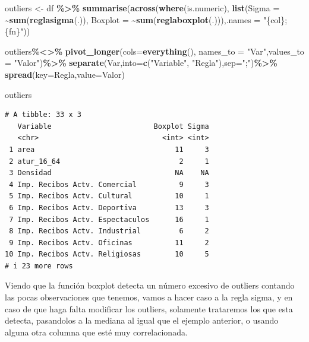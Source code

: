 \documentclass[notspecified,article,submit,moreauthors,pdftex]{Definitions/mdpi}
\newenvironment{Shaded}{\begin{snugshade}}{\end{snugshade}}
\newcommand{\AttributeTok}[1]{\textcolor[rgb]{0.13,0.29,0.53}{#1}}
\newcommand{\FunctionTok}[1]{\textcolor[rgb]{0.13,0.29,0.53}{\textbf{#1}}}
\newcommand{\NormalTok}[1]{#1}
\newcommand{\OtherTok}[1]{\textcolor[rgb]{0.56,0.35,0.01}{#1}}
\newcommand{\SpecialCharTok}[1]{\textcolor[rgb]{0.81,0.36,0.00}{\textbf{#1}}}
\newcommand{\StringTok}[1]{\textcolor[rgb]{0.31,0.60,0.02}{#1}}
\begin{document}
\begin{Shaded}
\begin{Highlighting}[]
\NormalTok{outliers }\OtherTok{\textless{}{-}}\NormalTok{ df }\SpecialCharTok{\%\textgreater{}\%}
  \FunctionTok{summarise}\NormalTok{(}\FunctionTok{across}\NormalTok{(}\FunctionTok{where}\NormalTok{(is.numeric), }\FunctionTok{list}\NormalTok{(}\AttributeTok{Sigma =} \SpecialCharTok{\textasciitilde{}}\FunctionTok{sum}\NormalTok{(}\FunctionTok{reglasigma}\NormalTok{(.)), }\AttributeTok{Boxplot =} \SpecialCharTok{\textasciitilde{}}\FunctionTok{sum}\NormalTok{(}\FunctionTok{reglaboxplot}\NormalTok{(.))),}\AttributeTok{.names =} \StringTok{"\{col\};\{fn\}"}\NormalTok{))}

\NormalTok{outliers}\SpecialCharTok{\%\textless{}\textgreater{}\%}
  \FunctionTok{pivot\_longer}\NormalTok{(}\AttributeTok{cols=}\FunctionTok{everything}\NormalTok{(), }\AttributeTok{names\_to =} \StringTok{"Var"}\NormalTok{,}\AttributeTok{values\_to =} \StringTok{"Valor"}\NormalTok{)}\SpecialCharTok{\%\textgreater{}\%}
  \FunctionTok{separate}\NormalTok{(Var,}\AttributeTok{into=}\FunctionTok{c}\NormalTok{(}\StringTok{"Variable"}\NormalTok{, }\StringTok{"Regla"}\NormalTok{),}\AttributeTok{sep=}\StringTok{";"}\NormalTok{)}\SpecialCharTok{\%\textgreater{}\%}
  \FunctionTok{spread}\NormalTok{(}\AttributeTok{key=}\NormalTok{Regla,}\AttributeTok{value=}\NormalTok{Valor)}

\NormalTok{outliers}
\end{Highlighting}
\end{Shaded}

\begin{verbatim}
# A tibble: 33 x 3
   Variable                        Boxplot Sigma
   <chr>                             <int> <int>
 1 area                                 11     3
 2 atur_16_64                            2     1
 3 Densidad                             NA    NA
 4 Imp. Recibos Actv. Comercial          9     3
 5 Imp. Recibos Actv. Cultural          10     1
 6 Imp. Recibos Actv. Deportiva         13     3
 7 Imp. Recibos Actv. Espectaculos      16     1
 8 Imp. Recibos Actv. Industrial         6     2
 9 Imp. Recibos Actv. Oficinas          11     2
10 Imp. Recibos Actv. Religiosas        10     5
# i 23 more rows
\end{verbatim}

Viendo que la función boxplot detecta un número excesivo de outliers
contando las pocas observaciones que tenemos, vamos a hacer caso a la
regla sigma, y en caso de que haga falta modificar los outliers,
solamente trataremos los que esta detecta, pasandolos a la mediana al
igual que el ejemplo anterior, o usando alguna otra columna que esté muy
correlacionada.
\end{document}
